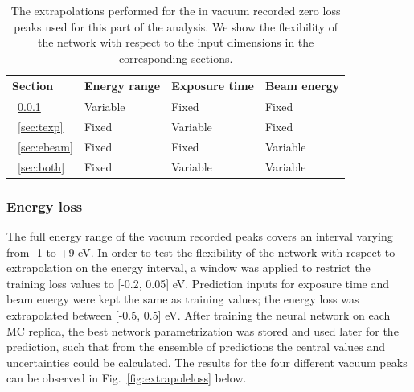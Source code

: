 \begin{table}[h]
  \renewcommand{\arraystretch}{1.40}
\begin{tabular}{|l|l|l|l|}
\toprule
Section  & Energy range & Exposure time & Beam energy \\ \hline
~\ref{sec:eloss} & Variable     & Fixed         & Fixed       \\
~\ref{sec:texp} & Fixed        & Variable      & Fixed       \\
~\ref{sec:ebeam} & Fixed        & Fixed         & Variable    \\
~\ref{sec:both} & Fixed        & Variable      & Variable    \\ \bottomrule
\end{tabular}
\vspace{0.4cm}
\caption{The extrapolations performed for the in vacuum recorded zero loss peaks used for this part of the analysis. We show the flexibility of the network with respect to the input dimensions in the corresponding sections.}
\label{table:vacuum}
\end{table}


\subsubsection{Energy loss}
\label{sec:eloss}

The full energy range of the vacuum recorded peaks covers an interval varying from -1 to +9 eV. In order to test the flexibility of the network with respect to extrapolation on the energy interval, a window was applied to restrict the training loss values to [-0.2, 0.05] eV. Prediction inputs for exposure time and beam energy were kept the same as training values; the energy loss was extrapolated between [-0.5, 0.5] eV. After training the neural network on each MC replica, the best network parametrization was stored and used later for the prediction, such that from the ensemble of predictions the central values and uncertainties could be calculated. The results for the four different vacuum peaks can be observed in Fig.~\ref{fig:extrapoleloss} below. 


